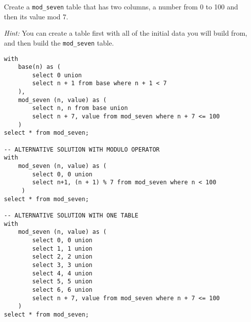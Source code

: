 \begin{blocksection}
\question Create a \lstinline$mod_seven$ table that has two columns, a number from 0 to 100 and then its value mod 7.

\emph{Hint:} You can create a table first with all of the initial data you will build from, and then build the \lstinline$mod_seven$ table.

\begin{solution}[2in]
\begin{lstlisting}
with
    base(n) as (
        select 0 union
        select n + 1 from base where n + 1 < 7
    ),
    mod_seven (n, value) as (
        select n, n from base union
        select n + 7, value from mod_seven where n + 7 <= 100
    )
select * from mod_seven;

-- ALTERNATIVE SOLUTION WITH MODULO OPERATOR
with
    mod_seven (n, value) as (
        select 0, 0 union
        select n+1, (n + 1) % 7 from mod_seven where n < 100
     )
select * from mod_seven;

-- ALTERNATIVE SOLUTION WITH ONE TABLE
with
    mod_seven (n, value) as (
        select 0, 0 union
        select 1, 1 union
        select 2, 2 union
        select 3, 3 union
        select 4, 4 union
        select 5, 5 union
        select 6, 6 union
        select n + 7, value from mod_seven where n + 7 <= 100
    )
select * from mod_seven;
\end{lstlisting}
\end{solution}
\end{blocksection}
